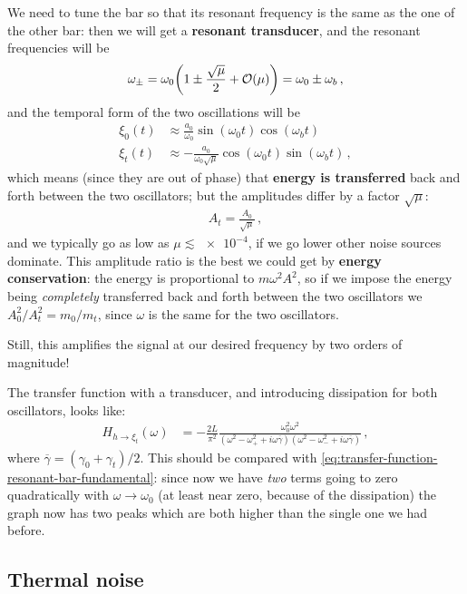 \documentclass[main.tex]{subfiles}
\begin{document}
We need to tune the bar so that its resonant frequency is the same as the one of the other bar: then we will get a \textbf{resonant transducer}, and the resonant frequencies will be 
%
\begin{align}
\omega_{\pm} = \omega_0 \qty(1 \pm \frac{\sqrt{\mu }}{2} + \mathcal{O}(\mu ))= \omega_0 \pm \omega_{b}
\,,
\end{align}
%
and the temporal form of the two oscillations will be 
%
\begin{align}
\xi_0 (t) &\approx \frac{a_0 }{\omega_0} \sin(\omega_0 t) \cos(\omega_{b}t)  \\
\xi_t (t) &\approx - \frac{a_0 }{\omega_0 \sqrt{\mu }} \cos(\omega_0 t) \sin(\omega_{b} t)
\,,
\end{align}
%
which means (since they are out of phase) that \textbf{energy is transferred} back and forth between the two oscillators; but the amplitudes differ by a factor \(\sqrt{\mu }\): 
%
\begin{align}
A_t = \frac{A_0 }{\sqrt{\mu }}
\,,
\end{align}
%
and we typically go as low as \(\mu \lesssim \num{e-4}\), if we go lower other noise sources dominate.
This amplitude ratio is the best we could get by \textbf{energy conservation}: the energy is proportional to \(m \omega^2 A^2\), so if we impose the energy being \emph{completely} transferred back and forth between the two oscillators we \(A_0^2 / A_t^2 = m_0 / m_t \), since \(\omega \) is the same for the two oscillators.

Still, this amplifies the signal at our desired frequency by two orders of magnitude!

The transfer function with a transducer, and introducing dissipation for both oscillators, looks like: 
%
\begin{align}
H_{h \to \xi_{t}} (\omega ) &= - \frac{2L}{\pi^2} \frac{\omega_0^2 \omega^2}{ (\omega^2 - \omega_{+}^2 + i \omega \overline{\gamma})(\omega^2 - \omega_{-}^2 + i \omega \overline{\gamma})}
\,,
\end{align}
%
where \(\overline{\gamma} = (\gamma_0 + \gamma_{t}) / 2\).
This should be compared with \eqref{eq:transfer-function-resonant-bar-fundamental}: since now we have \emph{two} terms going to zero quadratically with \(\omega \to \omega_0 \) (at least near zero, because of the dissipation) the graph now has two peaks which are both higher than the single one we had before.  

\subsection{Thermal noise}
\end{document}

